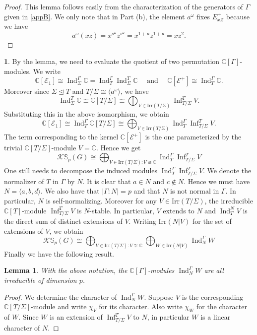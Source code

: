 \documentclass[12pt]{article}
\theoremstyle{plain}
\newtheorem{lemma}[theorem]{Lemma}
\theoremstyle{definition}
\newtheorem{nothing}[theorem]{}
\newcommand{\kerlin}{\mathbb S_p}
\newcommand{\ind}{\operatorname{Ind}}
\newcommand{\infl}{\operatorname{Inf}}
\begin{document}
\begin{proof}
    This lemma follows easily from the characterization of the generators of $\Gamma$ given in \ref{appB}. We only note that in Part (b), the element $a^\omega$ fixes $E_{xZ}^+$ because we have
    \[
    a^\omega(xz) = x^{s^\omega}z^{s^{\omega}} = x^{1+u}z^{1+u} = xz^{2}.
    \]
    \end{proof}
\begin{nothing}
By the lemma, we need to evaluate the quotient of two permutation $\mathbb C[\Gamma]$-modules. We write 
    \[
    \mathbb C[\mathcal{E}_1] \cong \ind_\Sigma^\Gamma \mathbb C = \ind_T^\Gamma \ind_\Sigma^T \mathbb C
    \quad
    \text{ and }
    \quad
    \mathbb C[\mathcal{E}^+] \cong \ind_T^\Gamma \mathbb C.
    \]
    Moreover since $\Sigma\unlhd T$ and $T/\Sigma\cong \langle a^\omega\rangle$, we have 
    \[
    \ind_\Sigma^T \mathbb C \cong \mathbb C[T/\Sigma] \cong \bigoplus_{V\in\text{Irr}(T/\Sigma)} \infl_{T/\Sigma}^T V.
    \]
    Substituting this in the above isomorphism,
    we obtain
    \[
    \mathbb C[\mathcal{E}_1] \cong \ind_T^\Gamma \mathbb C[T/\Sigma] \cong \bigoplus_{V\in\text{Irr}(T/\Sigma)} \ind_T^\Gamma\infl_{T/\Sigma}^T V.
    \]
    The term corresponding to the kernel $\mathbb C[\mathcal{E}^+]$ is the one parameterized by the trivial $\mathbb C[T/\Sigma]$-module $V=\mathbb C$.
    Hence we get
    \[
    \mathcal{K}\kerlin(G) \cong \bigoplus_{V\in\text{Irr}(T/\Sigma): V\not\cong \mathbb C} \ind_T^\Gamma\infl_{T/\Sigma}^T V
    \] 
    One still needs to decompose the induced modules 
    $\ind_T^\Gamma\infl_{T/\Sigma}^T V$. We denote the normalizer of $T$ in $\Gamma$ by $N$. It is clear that $a\in N$ and $c\not\in N$. Hence we must have 
    $N=\langle a, b, d\rangle$. We also have that $|\Gamma: N| = p$ and that $N$ is not normal in $\Gamma$. In particular, $N$ is self-normalizing. Moreover for any $V\in\text{Irr}(T/\Sigma)$, the irreducible $\mathbb C[T]$-module $\infl_{T/\Sigma}^T V$ is $N$-stable. In particular, $V$ extends to $N$ and $\ind_T^N V$ is the direct sum of distinct extensions of $V$. Writing $\text{Irr}(N|V)$ for the set of extensions of $V$, we obtain
    \[
    \mathcal{K}\kerlin(G) \cong \bigoplus_{V\in\text{Irr}(T/\Sigma): V\not\cong \mathbb C} \bigoplus_{W\in \text{Irr}(N|V) }\ind_N^\Gamma W
    \] 
    Finally we have the following result.
    \begin{lemma}\label{lem:irredps}
    With the above notation, the $\mathbb C[\Gamma]$-modules $\ind_N^\Gamma W$ are all irreducible of dimension $p$. 
    \end{lemma}
\begin{proof}
We determine the character of $\ind_N^\Gamma W$.
Suppose $V$ is the corresponding $\mathbb{C}[T/\Sigma]$-module and write $\chi_V$ for its 
character. Also write $\chi_W$ for the character of $W$. Since $W$ is an extension of 
$\infl_{T/\Sigma}^T V$ to $N$, in particular $W$ is a linear character of $N$.


\end{proof}
\end{nothing}
\end{document}
